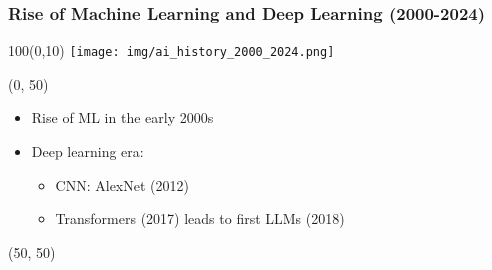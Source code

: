 \begin{frame}
  \frametitle{Rise of Machine Learning and Deep Learning (2000-2024)}

  \begin{textblock}{100}(0,10)
    \texttt{[image: img/ai\_history\_2000\_2024.png]}
  \end{textblock}

  \begin{textblock}{50}(0, 50)
    \begin{itemize}
    \item Rise of \ac{ML} in the early 2000s
    \item<2-> Deep learning era:
      \begin{itemize}
      \item CNN: AlexNet (2012)
      \item Transformers (2017) leads to first LLMs (2018)
      \end{itemize}
    \end{itemize}
  \end{textblock}

  \begin{textblock}{50}(50, 50)
  \end{textblock}

\end{frame}
